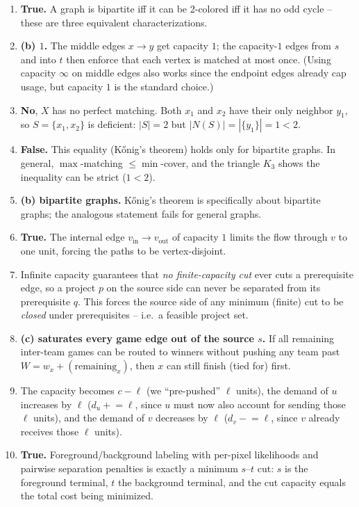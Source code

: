 \documentclass[11pt]{article}
\begin{document}
\begin{enumerate}[label=\textbf{B\arabic*.}, leftmargin=2.2em]

\item \textbf{True.} A graph is bipartite iff it can be 2-colored iff it has no
odd cycle -- these are three equivalent characterizations.

\item \textbf{(b) $1$.} The middle edges $x \to y$ get capacity $1$; the
capacity-$1$ edges from $s$ and into $t$ then enforce that each vertex is matched
at most once. (Using capacity $\infty$ on middle edges also works since the
endpoint edges already cap usage, but capacity $1$ is the standard choice.)

\item \textbf{No}, $X$ has no perfect matching. Both $x_1$ and $x_2$ have their
only neighbor $y_1$, so $S = \{x_1, x_2\}$ is deficient: $|S| = 2$ but
$|N(S)| = |\{y_1\}| = 1 < 2$.

\item \textbf{False.} This equality (K\H{o}nig's theorem) holds only for
bipartite graphs. In general, $\max$-matching $\le \min$-cover, and the triangle
$K_3$ shows the inequality can be strict ($1 < 2$).

\item \textbf{(b) bipartite graphs.} K\H{o}nig's theorem is specifically about
bipartite graphs; the analogous statement fails for general graphs.

\item \textbf{True.} The internal edge $v_{\text{in}} \to v_{\text{out}}$ of
capacity $1$ limits the flow through $v$ to one unit, forcing the paths to be
vertex-disjoint.

\item Infinite capacity guarantees that \emph{no finite-capacity cut} ever cuts a
prerequisite edge, so a project $p$ on the source side can never be separated
from its prerequisite $q$. This forces the source side of any minimum (finite)
cut to be \emph{closed} under prerequisites -- i.e.\ a feasible project set.

\item \textbf{(c) saturates every game edge out of the source $s$.} If all
remaining inter-team games can be routed to winners without pushing any team past
$W = w_x + (\text{remaining}_x)$, then $x$ can still finish (tied for) first.

\item The capacity becomes $c - \ell$ (we ``pre-pushed'' $\ell$ units), the
demand of $u$ increases by $\ell$ ($d_u \mathrel{+}= \ell$, since $u$ must now
also account for sending those $\ell$ units), and the demand of $v$ decreases by
$\ell$ ($d_v \mathrel{-}= \ell$, since $v$ already receives those $\ell$ units).

\item \textbf{True.} Foreground/background labeling with per-pixel likelihoods
and pairwise separation penalties is exactly a minimum $s$--$t$ cut: $s$ is the
foreground terminal, $t$ the background terminal, and the cut capacity equals the
total cost being minimized.

\end{enumerate}
\end{document}
